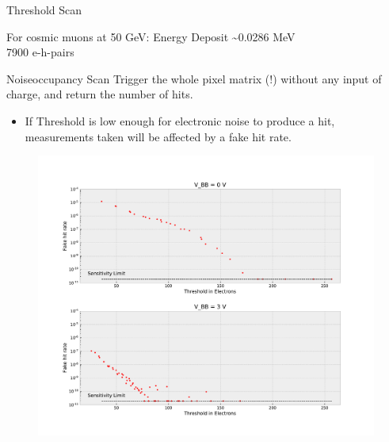 \documentclass{beamer}
\begin{document}
\begin{frame}{Threshold Scan}
\begin{minipage}{.49\textwidth}
\begin{figure}[H]
	\end{figure}
    \end{minipage}
    \pause
    For cosmic muons at 50 GeV:
    Energy Deposit \textasciitilde 0.0286 MeV\\
    7900 e-h-pairs
\end{frame}

\begin{frame}{Noiseoccupancy Scan}
    Trigger the whole pixel matrix (!) without any input of charge, and return
    the number of hits.
    \begin{itemize}
	\item If Threshold is low enough for electronic noise to produce a hit,
	    measurements taken will be affected by a fake hit rate.
    \end{itemize}
    \pause
    \begin{figure}[H]
	\centering
	\includegraphics[trim=0 360 0 68, clip, width=\textwidth]{Fake_Hit_Rate.pdf}
    \end{figure}
    \tiny \ \\ \ \\ \
\end{frame}
\end{document}
